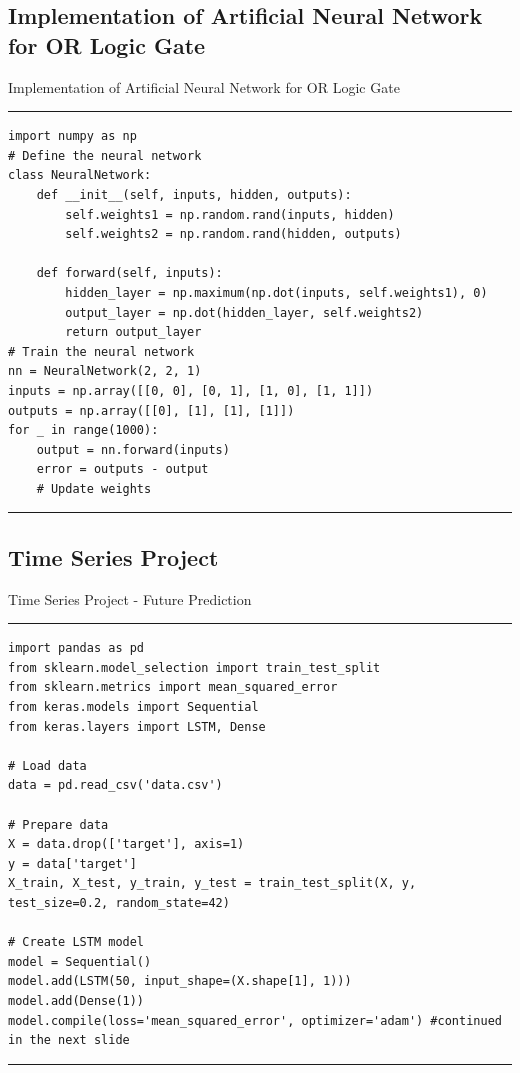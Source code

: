 \documentclass[aspectratio=169, hideothersubsections]{beamer}
\begin{document}
\subsection{Implementation of Artificial Neural Network for OR Logic Gate}
\begin{frame}[fragile]{Implementation of Artificial Neural Network for OR Logic Gate}
\rule{\textwidth}{1pt}
\scriptsize
\begin{verbatim}
import numpy as np
# Define the neural network
class NeuralNetwork:
    def __init__(self, inputs, hidden, outputs):
        self.weights1 = np.random.rand(inputs, hidden)
        self.weights2 = np.random.rand(hidden, outputs)

    def forward(self, inputs):
        hidden_layer = np.maximum(np.dot(inputs, self.weights1), 0)
        output_layer = np.dot(hidden_layer, self.weights2)
        return output_layer
# Train the neural network
nn = NeuralNetwork(2, 2, 1)
inputs = np.array([[0, 0], [0, 1], [1, 0], [1, 1]])
outputs = np.array([[0], [1], [1], [1]])
for _ in range(1000):
    output = nn.forward(inputs)
    error = outputs - output
    # Update weights
\end{verbatim}
\rule{\textwidth}{1pt}
\end{frame}

\subsection{Time Series Project}
\begin{frame}[fragile]{Time Series Project - Future Prediction}
\rule{\textwidth}{1pt}
\scriptsize
\begin{verbatim}
import pandas as pd
from sklearn.model_selection import train_test_split
from sklearn.metrics import mean_squared_error
from keras.models import Sequential
from keras.layers import LSTM, Dense

# Load data
data = pd.read_csv('data.csv')

# Prepare data
X = data.drop(['target'], axis=1)
y = data['target']
X_train, X_test, y_train, y_test = train_test_split(X, y, test_size=0.2, random_state=42)

# Create LSTM model
model = Sequential()
model.add(LSTM(50, input_shape=(X.shape[1], 1)))
model.add(Dense(1))
model.compile(loss='mean_squared_error', optimizer='adam') #continued in the next slide
\end{verbatim}
\rule{\textwidth}{1pt}
\end{frame}
\end{document}
